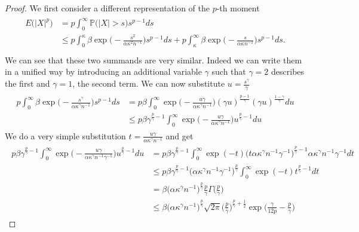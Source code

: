 \documentclass[10pt,a4paper]{amsart}
\newcommand{\p}{\ensuremath{\mathbb{P}}}
\begin{document}
\begin{proof}
We first consider a different representation of the \(p\)-th moment
\begin{align}
\begin{split}
E\big(\vert X \vert^p\big) & = p\int_0^\infty \p \big(\big\vert X \big\vert > s\big) s^{p-1} ds\\
& \leq p \int_0^{\kappa} \beta\exp\Big( -\frac{s^2}{\alpha\kappa^2 n^{-1}} \Big) s^{p-1} ds + p\int_ {\kappa}^\infty \beta\exp\Big( -\frac{s}{\alpha\kappa n^{-1}} \Big) s^{p-1} ds. \\
\end{split}
\end{align}
We can see that these two summands are very similar. Indeed we can write them in a unified way by introducing an additional variable \(\gamma\) such that \(\gamma = 2\) describes the first and \(\gamma = 1\), the second term. We can now substitute \(u = \frac{s^\gamma}{\gamma}\)
\begin{align}
\begin{split}
p\int_ {0}^\infty \beta\exp\Big( -\frac{s^\gamma}{\alpha\kappa^\gamma n^{-1}} \Big) s^{p-1} ds & = p\beta \int_ {0}^\infty \exp\Big( -\frac{u \gamma}{\alpha\kappa^\gamma n^{-1}} \Big) (\gamma u)^{\frac{p-1}{\gamma}} (\gamma u)^{\frac{1-\gamma}{\gamma}}du \\
& \leq p \beta \gamma^{\frac{p}{\gamma}-1} \int_ {0}^\infty \exp\Big( -\frac{u \gamma}{\alpha\kappa^\gamma n^{-1}} \Big) u^{\frac{p}{\gamma}-1} du
\end{split}
\end{align}
We do a very simple substitution \(t = \frac{u\gamma}{\alpha\kappa^\gamma n^{-1}}\) and get 
\begin{align}
\begin{split}
p \beta \gamma^{\frac{p}{\gamma}-1}\int_ {0}^\infty \exp\Big( -\frac{u \gamma}{\alpha\kappa^\gamma n^{-1} \gamma^{-1}} \Big) u^{\frac{p}{\gamma}-1} du & = p \beta \gamma^{\frac{p}{\gamma}-1} \int_ {0}^\infty \exp( -t ) \big( t \alpha \kappa^\gamma n^{-1} \gamma^{-1}\big)^{\frac{p}{\gamma}-1} \alpha \kappa^\gamma n^{-1} \gamma^{-1} dt \\
& \leq p \beta \gamma^{\frac{p}{\gamma}-1} \big(\alpha \kappa^\gamma n^{-1} \gamma^{-1}\big)^{\frac{p}{\gamma}} \int_{0}^\infty \exp(-t ) t^{\frac{p}{\gamma}-1} dt \\
& =  \beta \big(\alpha \kappa^\gamma n^{-1}\big)^{\frac{p}{\gamma}} \frac{p}{\gamma} \Gamma\Big(\frac{p}{\gamma}\Big) \\
& \leq \beta \big(\alpha \kappa^\gamma n^{-1}\big)^{\frac{p}{\gamma}} \sqrt{2 \pi} \Big(\frac{p}{\gamma}\Big)^{\frac{p}{\gamma}+ \frac{1}{2}} \exp\big( \frac{\gamma}{12p}-\frac{p}{\gamma} \big)

\end{split}
\end{align}
\end{proof}
\end{document}
